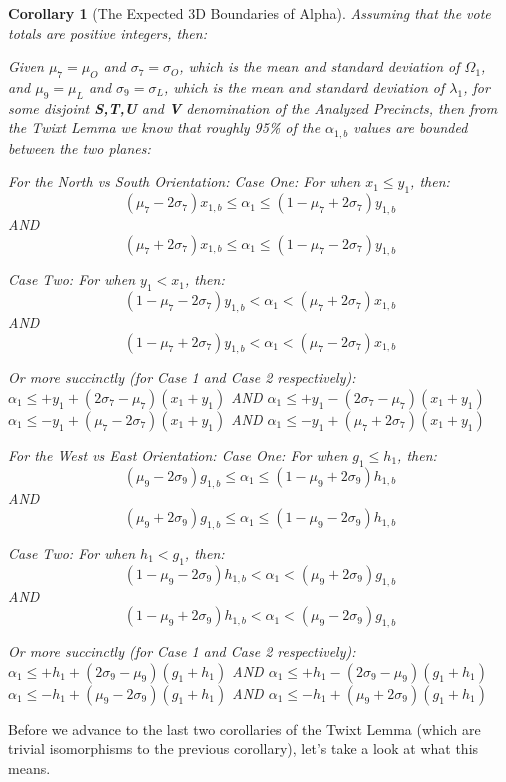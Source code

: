 \documentclass[preprint,13pt]{elsarticle}
\newtheorem{corollary}{Corollary}[theorem]
\begin{document}
\begin{corollary}[The Expected 3D Boundaries of Alpha]
Assuming that the vote totals are positive integers, then:

Given $\mu_{7}=\mu_{O}$ and $\sigma_{7}=\sigma_{O}$, which is the mean and standard deviation of $\Omega_{1}$, and $\mu_{9}=\mu_{L}$ and $\sigma_{9}=\sigma_{L}$, which is the mean and standard deviation of $\lambda_{1}$, for some disjoint \textbf{S,T,U} and \textbf{V} denomination of the Analyzed Precincts, then from the Twixt Lemma we know that roughly 95\% of the $\alpha_{1,b}$ values are bounded between the two planes:

For the North vs South Orientation:
Case One:  For when $x_{1} \le y_{1}$, then:
$$(\mu_{7}-2\sigma_{7})x_{1,b} \le \alpha_{1} \le (1-\mu_{7}+2\sigma_{7})y_{1,b}$$
AND
$$(\mu_{7}+2\sigma_{7})x_{1,b} \le \alpha_{1} \le (1-\mu_{7}-2\sigma_{7})y_{1,b}$$

Case Two: For when $y_{1} < x_{1}$, then:
$$(1-\mu_{7}-2\sigma_{7})y_{1,b} < \alpha_{1} < (\mu_{7}+2\sigma_{7})x_{1,b}$$
AND
$$(1-\mu_{7}+2\sigma_{7})y_{1,b} < \alpha_{1} < (\mu_{7}-2\sigma_{7})x_{1,b}$$

Or more succinctly (for Case 1 and Case 2 respectively):\\
$\alpha_{1} \le +y_{1}+(2\sigma_{7}-\mu_{7})(x_{1}+y_{1})$ AND $\alpha_{1} \le +y_{1}-(2\sigma_{7}-\mu_{7})(x_{1}+y_{1})$\\
$\alpha_{1} \le -y_{1}+(\mu_{7}-2\sigma_{7})(x_{1}+y_{1})$ AND $\alpha_{1} \le -y_{1}+(\mu_{7}+2\sigma_{7})(x_{1}+y_{1})$

For the West vs East Orientation:
Case One:  For when $g_{1} \le h_{1}$, then:
$$(\mu_{9}-2\sigma_{9})g_{1,b} \le \alpha_{1} \le (1-\mu_{9}+2\sigma_{9})h_{1,b}$$
AND
$$(\mu_{9}+2\sigma_{9})g_{1,b} \le \alpha_{1} \le (1-\mu_{9}-2\sigma_{9})h_{1,b}$$

Case Two: For when $h_{1} < g_{1}$, then:
$$(1-\mu_{9}-2\sigma_{9})h_{1,b} < \alpha_{1} < (\mu_{9}+2\sigma_{9})g_{1,b}$$
AND
$$(1-\mu_{9}+2\sigma_{9})h_{1,b} < \alpha_{1} < (\mu_{9}-2\sigma_{9})g_{1,b}$$

Or more succinctly (for Case 1 and Case 2 respectively):\\
$\alpha_{1} \le +h_{1}+(2\sigma_{9}-\mu_{9})(g_{1}+h_{1})$ AND $\alpha_{1} \le +h_{1}-(2\sigma_{9}-\mu_{9})(g_{1}+h_{1})$\\
$\alpha_{1} \le -h_{1}+(\mu_{9}-2\sigma_{9})(g_{1}+h_{1})$ AND $\alpha_{1} \le -h_{1}+(\mu_{9}+2\sigma_{9})(g_{1}+h_{1})$
\end{corollary}
\newpage
Before we advance to the last two corollaries of the Twixt Lemma (which are trivial isomorphisms to the previous corollary), let's take a look at what this means.
\end{document}
